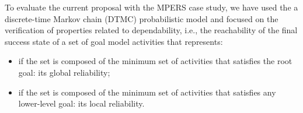 To evaluate the current proposal with the MPERS case study, we have used the a discrete-time Markov chain (DTMC) probabilistic model and focused on the verification of properties related to dependability, i.e., the reachability of the final success state of a set of goal model activities that represents: 

\begin{itemize}

\item if the set is composed of the minimum set of activities that satisfies the root goal: its global reliability;  

\item if the set is composed of the minimum set of activities that satisfies any lower-level goal: its local reliability.

\end{itemize}